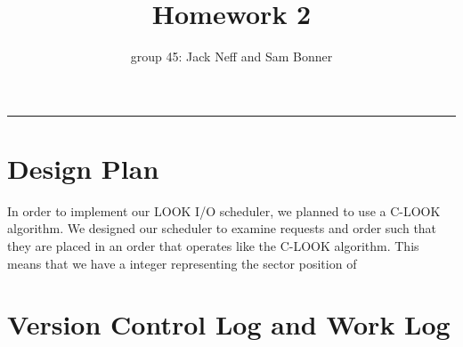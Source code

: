 \documentclass[letterpaper,10pt,fleqn]{article}
\title{Homework 2}
\author{group 45: Jack Neff and Sam Bonner}
\begin{document}
\maketitle
\hrule

\section*{Design Plan}

In order to implement our LOOK I/O scheduler, we planned to use a C-LOOK algorithm. We designed our scheduler to examine requests and order such that they are placed in an order that operates like the C-LOOK algorithm. This means that we have a integer representing the sector position of 

\section{Version Control Log and Work Log}
 
\end{document}
